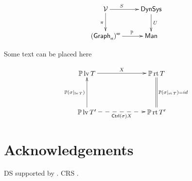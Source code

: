\documentclass[aps,twocolumn]{revtex4}
\begin{document}
\begin{center}
\end{center}

\begin{equation}\label{eq:star}
\xymatrix{
{\mathcal V}  \ar[r]^{S \quad\quad } \ar[d]_{\pi}
&  \mathsf{DynSys} \ar[d]^{U}  \\
 \op{(\et{\Graph})}  \ar[r]^{\quad\mathbb{P} }
&  \mathsf{Man} }
\end{equation}

Some text can be placed here \cite{Gould1994}

\begin{equation*}
\xy
(-18, 10)*+{\PP\lv T} ="1"; 
(18, 10)*+{\PP\rt T} ="2";
(-18,-10)*+{\PP\lv T'}="3";
(18,-10)*+{\PP \rt T'}="4";
{\ar@{->}^X "1";"2"};
{\ar@{->}^{\PP(\sigma|_{\lv T})} "3";"1"};
{\ar@{=}_{\PP(\sigma|_{\rt T}) = id } "4";"2"};
{\ar@{-->}_{\Ctrl(\sigma)X} "3";"4"};
\endxy
\end{equation*}


\section{Acknowledgements} 

DS supported by .
CRS .

 

\end{document}
